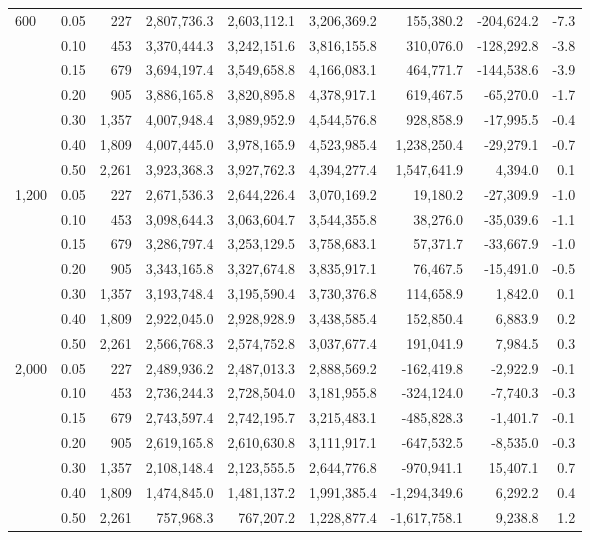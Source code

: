 \begin{table}[htbp]
\begin{adjustbox}{max width=\linewidth}
\begin{tabular}{llrrrrrrr}
\cline{1-9}
\multirow[t]{7}{*}{600} & 0.05 & 227 & 2,807,736.3 & 2,603,112.1 & 3,206,369.2 & 155,380.2 & -204,624.2 & -7.3 \\
 & 0.10 & 453 & 3,370,444.3 & 3,242,151.6 & 3,816,155.8 & 310,076.0 & -128,292.8 & -3.8 \\
 & 0.15 & 679 & 3,694,197.4 & 3,549,658.8 & 4,166,083.1 & 464,771.7 & -144,538.6 & -3.9 \\
 & 0.20 & 905 & 3,886,165.8 & 3,820,895.8 & 4,378,917.1 & 619,467.5 & -65,270.0 & -1.7 \\
 & 0.30 & 1,357 & 4,007,948.4 & 3,989,952.9 & 4,544,576.8 & 928,858.9 & -17,995.5 & -0.4 \\
 & 0.40 & 1,809 & 4,007,445.0 & 3,978,165.9 & 4,523,985.4 & 1,238,250.4 & -29,279.1 & -0.7 \\
 & 0.50 & 2,261 & 3,923,368.3 & 3,927,762.3 & 4,394,277.4 & 1,547,641.9 & 4,394.0 & 0.1 \\
\cline{1-9}
\multirow[t]{7}{*}{1,200} & 0.05 & 227 & 2,671,536.3 & 2,644,226.4 & 3,070,169.2 & 19,180.2 & -27,309.9 & -1.0 \\
 & 0.10 & 453 & 3,098,644.3 & 3,063,604.7 & 3,544,355.8 & 38,276.0 & -35,039.6 & -1.1 \\
 & 0.15 & 679 & 3,286,797.4 & 3,253,129.5 & 3,758,683.1 & 57,371.7 & -33,667.9 & -1.0 \\
 & 0.20 & 905 & 3,343,165.8 & 3,327,674.8 & 3,835,917.1 & 76,467.5 & -15,491.0 & -0.5 \\
 & 0.30 & 1,357 & 3,193,748.4 & 3,195,590.4 & 3,730,376.8 & 114,658.9 & 1,842.0 & 0.1 \\
 & 0.40 & 1,809 & 2,922,045.0 & 2,928,928.9 & 3,438,585.4 & 152,850.4 & 6,883.9 & 0.2 \\
 & 0.50 & 2,261 & 2,566,768.3 & 2,574,752.8 & 3,037,677.4 & 191,041.9 & 7,984.5 & 0.3 \\
\cline{1-9}
\multirow[t]{7}{*}{2,000} & 0.05 & 227 & 2,489,936.2 & 2,487,013.3 & 2,888,569.2 & -162,419.8 & -2,922.9 & -0.1 \\
 & 0.10 & 453 & 2,736,244.3 & 2,728,504.0 & 3,181,955.8 & -324,124.0 & -7,740.3 & -0.3 \\
 & 0.15 & 679 & 2,743,597.4 & 2,742,195.7 & 3,215,483.1 & -485,828.3 & -1,401.7 & -0.1 \\
 & 0.20 & 905 & 2,619,165.8 & 2,610,630.8 & 3,111,917.1 & -647,532.5 & -8,535.0 & -0.3 \\
 & 0.30 & 1,357 & 2,108,148.4 & 2,123,555.5 & 2,644,776.8 & -970,941.1 & 15,407.1 & 0.7 \\
 & 0.40 & 1,809 & 1,474,845.0 & 1,481,137.2 & 1,991,385.4 & -1,294,349.6 & 6,292.2 & 0.4 \\
 & 0.50 & 2,261 & 757,968.3 & 767,207.2 & 1,228,877.4 & -1,617,758.1 & 9,238.8 & 1.2 \\
\cline{1-9}
\bottomrule
\end{tabular}
\end{adjustbox}
\end{table}
